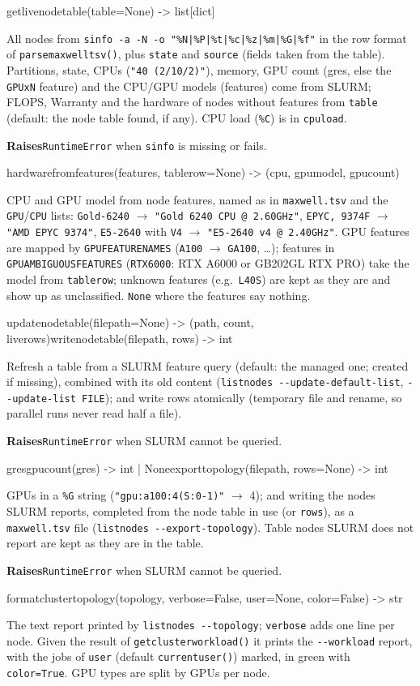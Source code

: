 \documentclass[11pt,a4paper]{article}
\newcommand{\api}[1]{%
  \par\medskip
  \begin{tcolorbox}[colback=sigbg, colframe=sigbg, boxrule=0pt, arc=1pt, left=4pt, right=4pt, top=2pt, bottom=2pt, breakable]
  \raggedright\ttfamily\small #1
  \end{tcolorbox}\nopagebreak\vspace{-4pt}%
}
\DeclareRobustCommand{\_}{\textunderscore\allowbreak}
\newcommand{\cmd}[1]{\texttt{#1}}
\newcommand{\raises}{\par\textsf{\small\bfseries Raises}\quad}
\begin{document}
\api{get\_live\_node\_table(table=None) -> list[dict]}
All nodes from \cmd{sinfo -a -N -o "\%N|\%P|\%t|\%c|\%z|\%m|\%G|\%f"} in the row format of
\cmd{parse\_maxwell\_tsv()}, plus \cmd{state} and \cmd{source} (fields taken from the table).
Partitions, state, CPUs (\cmd{"40 (2/10/2)"}), memory, GPU count (gres, else the \cmd{GPUxN}
feature) and the CPU/GPU models (features) come from SLURM; FLOPS, Warranty and the hardware of
nodes without features from \cmd{table} (default: the node table found, if any). CPU load
(\cmd{\%C}) is in \cmd{cpu\_load}.
\raises \cmd{RuntimeError} when \cmd{sinfo} is missing or fails.

\api{hardware\_from\_features(features, table\_row=None) -> (cpu, gpu\_model, gpu\_count)}
CPU and GPU model from node features, named as in \cmd{maxwell.tsv} and the \cmd{GPU\_*}/\cmd{CPU\_*}
lists: \cmd{Gold-6240} $\rightarrow$ \cmd{"Gold 6240 CPU @ 2.60GHz"}, \cmd{EPYC, 9374F} $\rightarrow$
\cmd{"AMD EPYC 9374"}, \cmd{E5-2640} with \cmd{V4} $\rightarrow$ \cmd{"E5-2640 v4 @ 2.40GHz"}. GPU
features are mapped by \cmd{GPU\_FEATURE\_NAMES} (\cmd{A100} $\rightarrow$ \cmd{GA100}, \ldots);
features in \cmd{GPU\_AMBIGUOUS\_FEATURES} (\cmd{RTX6000}: RTX A6000 or GB202GL RTX PRO) take the
model from \cmd{table\_row}; unknown features (e.g.\ \cmd{L40S}) are kept as they are and show up as
unclassified. \cmd{None} where the features say nothing.

\api{update\_node\_table(file\_path=None) -> (path, count, live\_rows)\quad write\_node\_table(file\_path, rows) -> int}
Refresh a table from a SLURM feature query (default: the managed one; created if missing), combined
with its old content (\cmd{listnodes -{}-update-default-list}, \cmd{-{}-update-list FILE}); and write
rows atomically (temporary file and rename, so parallel runs never read half a file).
\raises \cmd{RuntimeError} when SLURM cannot be queried.

\api{gres\_gpu\_count(gres) -> int | None\quad export\_topology(file\_path, rows=None) -> int}
GPUs in a \cmd{\%G} string (\cmd{"gpu:a100:4(S:0-1)"} $\rightarrow$ 4); and writing the nodes SLURM
reports, completed from the node table in use (or \cmd{rows}), as a \cmd{maxwell.tsv} file
(\cmd{listnodes -{}-export-topology}). Table nodes SLURM does not report are kept as they are in the table.
\raises \cmd{RuntimeError} when SLURM cannot be queried.

\api{format\_cluster\_topology(topology, verbose=False, user=None, color=False) -> str}
The text report printed by \cmd{listnodes -{}-topology}; \cmd{verbose} adds one line per node.
Given the result of \cmd{get\_cluster\_workload()} it prints the \cmd{-{}-workload} report, with the
jobs of \cmd{user} (default \cmd{current\_user()}) marked, in green with \cmd{color=True}. GPU types
are split by GPUs per node.
\end{document}
